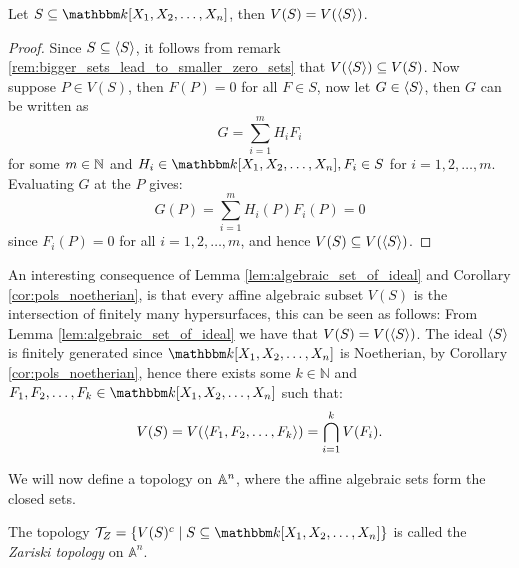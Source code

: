 \begin{lemma}\label{lem:algebraic_set_of_ideal}
  Let $S \subseteq \pols$, then $V(S) = V(\langle S\rangle)$.
\end{lemma}
\begin{proof}
  Since $S \subseteq \langle S\rangle$, it follows from remark \ref{rem:bigger_sets_lead_to_smaller_zero_sets} that $V(\langle S\rangle) \subseteq V(S)$. Now suppose $P \in V(S)$, then $F(P) = 0$ for all $F \in S$, now let $G \in \langle S\rangle$, then $G$ can be written as
  \begin{equation*}
    G = \sum^{m}_{i = 1} H_{i} F_{i}
  \end{equation*}
  for some $m \in \mathbb{N}$ and $H_{i} \in \K[X_1, X_2, \ldots, X_{n}], F_{i} \in S$ for $i = 1, 2, \ldots, m$. Evaluating $G$ at the $P$ gives:
  \begin{equation*}
    G(P)=\sum^{m}_{i = 1} H_{i}(P) F_{i}(P) = 0
  \end{equation*}
  since $F_{i}(P) = 0$ for all $i = 1,2, \ldots, m$, and hence $V(S) \subseteq V(\langle S\rangle)$.
\end{proof}
An interesting consequence of Lemma \ref{lem:algebraic_set_of_ideal} and Corollary \ref{cor:pols_noetherian}, is that every affine algebraic subset $V(S)$ is the intersection of finitely many hypersurfaces, this can be seen as follows: From Lemma \ref{lem:algebraic_set_of_ideal} we have that $V(S) = V(\langle S\rangle)$. The ideal $\langle S\rangle$ is finitely generated since $\K[X_1, X_2, \ldots, X_{n}]$ is Noetherian, by Corollary \ref{cor:pols_noetherian}, hence there exists some $k \in \mathbb{N}$ and $F_1, F_2, \ldots, F_{k} \in \K[X_1, X_2, \ldots, X_{n}]$ such that:
\begin{equation*}
  V(S) = V(\langle F_1, F_2, \ldots, F_{k}\rangle) = \bigcap_{i = 1}^k V(F_{i}).
\end{equation*}

We will now define a topology on $\mathbb{A}^{n}$, where the affine algebraic sets form the closed sets.
\begin{definition}
  The topology $\mathcal{T}_{Z} = \{V(S)^{c} \;\vert\; S \subseteq \pols\}$ is called the \textit{Zariski topology} on $\mathbb{A}^{n}$.
\end{definition}

